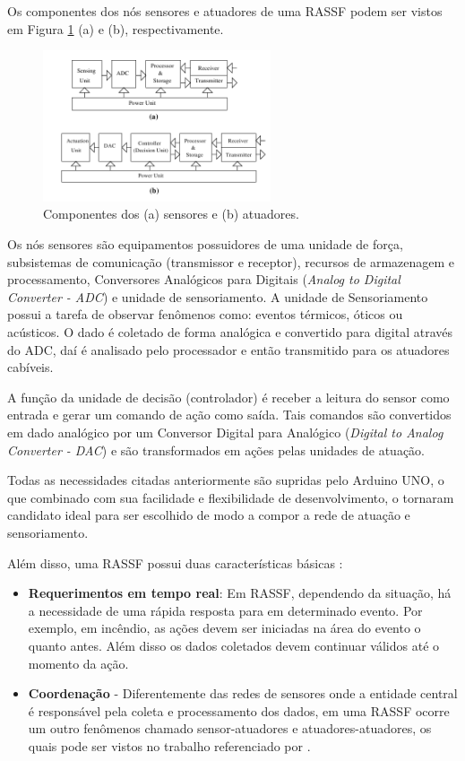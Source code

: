\documentclass[12pt,a4paper,oneside]{report}
\begin{document}
Os componentes dos nós sensores e atuadores de uma RASSF podem ser vistos em Figura \ref{fig:componentes-atuador-sensor} (a) e (b), respectivamente.

\begin{figure}[htbp]
   \centering
    \includegraphics[width=0.6\textwidth]{figuras/figura_2_7}
    \caption{Componentes dos (a) sensores e (b) atuadores.}
    \label{fig:componentes-atuador-sensor}
\end{figure}

Os nós sensores são equipamentos possuidores de uma unidade de força, subsistemas de comunicação (transmissor e receptor), recursos de armazenagem e processamento, Conversores Analógicos para Digitais (\emph{Analog to Digital Converter - ADC}) e unidade de sensoriamento. A unidade de Sensoriamento possui a tarefa de observar fenômenos como: eventos térmicos, óticos ou acústicos. O dado é coletado de forma analógica e convertido para digital através do ADC, daí é analisado pelo processador e então transmitido para os atuadores cabíveis.

A função da unidade de decisão (controlador) é receber a leitura do sensor como entrada e gerar um comando de ação como saída. Tais comandos são convertidos em dado analógico por um Conversor Digital para Analógico (\emph{Digital to Analog Converter - DAC}) e são transformados em ações pelas unidades de atuação.

Todas as necessidades citadas anteriormente são supridas pelo Arduino UNO, o que combinado com sua facilidade e flexibilidade de desenvolvimento, o tornaram candidato ideal para ser escolhido de modo a compor a rede de atuação e sensoriamento.

Além disso, uma RASSF possui duas características básicas \cite{wsaniais}:
\begin{itemize}
    \item \textbf{Requerimentos em tempo real}: Em RASSF, dependendo da situação, há a necessidade de uma rápida resposta para em determinado evento. Por exemplo, em incêndio, as ações devem ser iniciadas na área do evento o quanto antes. Além disso os dados coletados devem continuar válidos até o momento da ação.
    \item \textbf{Coordenação} - Diferentemente das redes de sensores onde a entidade central é responsável pela coleta e processamento dos dados, em  uma RASSF ocorre um outro fenômenos chamado sensor-atuadores e atuadores-atuadores, os quais pode ser vistos no trabalho referenciado por \cite{wsaniais}.
\end{itemize}
\end{document}
